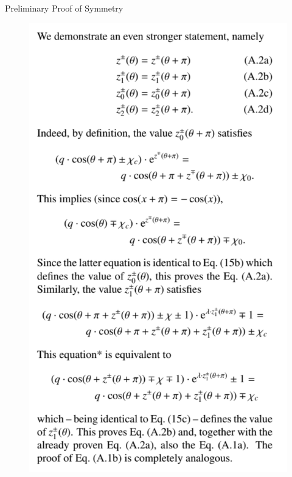 \begin{frame}{Preliminary Proof of Symmetry}
{\begin{figure}
			\includegraphics[height=0.7 \textheight]{Figs/paper_proof_2.png}
		\end{figure}
	}

	\flushright{[Zhusubaliyev]}
\end{frame}

